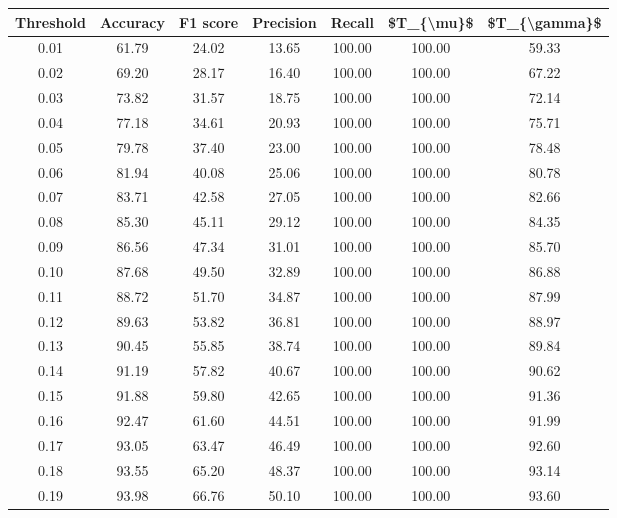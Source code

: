 \begin{tabular}{|c|c|c|c|c|c|c|}
\hline
 Threshold &  Accuracy &  F1 score &  Precision &  Recall &  \$T\_\{\textbackslash mu\}\$ &  \$T\_\{\textbackslash gamma\}\$ \\
\hline
      0.01 &     61.79 &     24.02 &      13.65 &  100.00 &     100.00 &         59.33 \\
      0.02 &     69.20 &     28.17 &      16.40 &  100.00 &     100.00 &         67.22 \\
      0.03 &     73.82 &     31.57 &      18.75 &  100.00 &     100.00 &         72.14 \\
      0.04 &     77.18 &     34.61 &      20.93 &  100.00 &     100.00 &         75.71 \\
      0.05 &     79.78 &     37.40 &      23.00 &  100.00 &     100.00 &         78.48 \\
      0.06 &     81.94 &     40.08 &      25.06 &  100.00 &     100.00 &         80.78 \\
      0.07 &     83.71 &     42.58 &      27.05 &  100.00 &     100.00 &         82.66 \\
      0.08 &     85.30 &     45.11 &      29.12 &  100.00 &     100.00 &         84.35 \\
      0.09 &     86.56 &     47.34 &      31.01 &  100.00 &     100.00 &         85.70 \\
      0.10 &     87.68 &     49.50 &      32.89 &  100.00 &     100.00 &         86.88 \\
      0.11 &     88.72 &     51.70 &      34.87 &  100.00 &     100.00 &         87.99 \\
      0.12 &     89.63 &     53.82 &      36.81 &  100.00 &     100.00 &         88.97 \\
      0.13 &     90.45 &     55.85 &      38.74 &  100.00 &     100.00 &         89.84 \\
      0.14 &     91.19 &     57.82 &      40.67 &  100.00 &     100.00 &         90.62 \\
      0.15 &     91.88 &     59.80 &      42.65 &  100.00 &     100.00 &         91.36 \\
      0.16 &     92.47 &     61.60 &      44.51 &  100.00 &     100.00 &         91.99 \\
      0.17 &     93.05 &     63.47 &      46.49 &  100.00 &     100.00 &         92.60 \\
      0.18 &     93.55 &     65.20 &      48.37 &  100.00 &     100.00 &         93.14 \\
      0.19 &     93.98 &     66.76 &      50.10 &  100.00 &     100.00 &         93.60 \\

\end{tabular}

